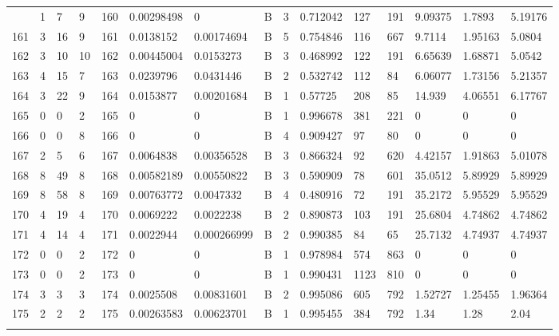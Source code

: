\begin{latin}
\begin{longtable}{lllllllllllllll}
\begin{comment}
	160 & 1  & 7   & 9  & 160 & 0.00298498     & 0              & B & 3  & 0.712042 & 127  & 191  & 9.09375 & 1.7893  & 5.19176 \\
	161 & 3  & 16  & 9  & 161 & 0.0138152      & 0.00174694     & B & 5  & 0.754846 & 116  & 667  & 9.7114  & 1.95163 & 5.0804  \\
	162 & 3  & 10  & 10 & 162 & 0.00445004     & 0.0153273      & B & 3  & 0.468992 & 122  & 191  & 6.65639 & 1.68871 & 5.0542  \\
	163 & 4  & 15  & 7  & 163 & 0.0239796      & 0.0431446      & B & 2  & 0.532742 & 112  & 84   & 6.06077 & 1.73156 & 5.21357 \\
	164 & 3  & 22  & 9  & 164 & 0.0153877      & 0.00201684     & B & 1  & 0.57725  & 208  & 85   & 14.939  & 4.06551 & 6.17767 \\
	165 & 0  & 0   & 2  & 165 & 0              & 0              & B & 1  & 0.996678 & 381  & 221  & 0       & 0       & 0       \\
	166 & 0  & 0   & 8  & 166 & 0              & 0              & B & 4  & 0.909427 & 97   & 80   & 0       & 0       & 0       \\
	167 & 2  & 5   & 6  & 167 & 0.0064838      & 0.00356528     & B & 3  & 0.866324 & 92   & 620  & 4.42157 & 1.91863 & 5.01078 \\
	168 & 8  & 49  & 8  & 168 & 0.00582189     & 0.00550822     & B & 3  & 0.590909 & 78   & 601  & 35.0512 & 5.89929 & 5.89929 \\
	169 & 8  & 58  & 8  & 169 & 0.00763772     & 0.0047332      & B & 4  & 0.480916 & 72   & 191  & 35.2172 & 5.95529 & 5.95529 \\
	170 & 4  & 19  & 4  & 170 & 0.0069222      & 0.0022238      & B & 2  & 0.890873 & 103  & 191  & 25.6804 & 4.74862 & 4.74862 \\
	171 & 4  & 14  & 4  & 171 & 0.0022944      & 0.000266999    & B & 2  & 0.990385 & 84   & 65   & 25.7132 & 4.74937 & 4.74937 \\
	172 & 0  & 0   & 2  & 172 & 0              & 0              & B & 1  & 0.978984 & 574  & 863  & 0       & 0       & 0       \\
	173 & 0  & 0   & 2  & 173 & 0              & 0              & B & 1  & 0.990431 & 1123 & 810  & 0       & 0       & 0       \\
	174 & 3  & 3   & 3  & 174 & 0.0025508      & 0.00831601     & B & 2  & 0.995086 & 605  & 792  & 1.52727 & 1.25455 & 1.96364 \\
	175 & 2  & 2   & 2  & 175 & 0.00263583     & 0.00623701     & B & 1  & 0.995455 & 384  & 792  & 1.34    & 1.28    & 2.04    \\

\end{comment}
\end{longtable}
\end{latin}
